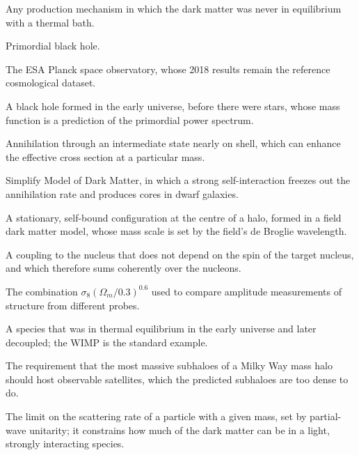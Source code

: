 \begin{description}[style=nextline,leftmargin=0pt,labelwidth=0pt,labelsep=0pt,
  font=\sffamily\bfseries\small,itemsep=5pt]
\item[Nonthermal production] Any production mechanism in which the dark
matter was never in equilibrium with a thermal bath.

\item[PBH] Primordial black hole.

\item[Planck] The ESA Planck space observatory, whose 2018 results remain
the reference cosmological dataset.

\item[Primordial black hole] A black hole formed in the early universe,
before there were stars, whose mass function is a prediction of the
primordial power spectrum.

\item[Resonance] Annihilation through an intermediate state nearly on shell,
which can enhance the effective cross section at a particular mass.

\item[SIMP] Simplify Model of Dark Matter, in which a strong self-interaction
freezes out the annihilation rate and produces cores in dwarf galaxies.

\item[Soliton] A stationary, self-bound configuration at the centre of a
halo, formed in a field dark matter model, whose mass scale is set by the
field's de Broglie wavelength.

\item[Spin-independent coupling] A coupling to the nucleus that does not
depend on the spin of the target nucleus, and which therefore sums
coherently over the nucleons.

\item[S$8$] The combination $\sigma_8(\Omega_m/0.3)^{0.6}$ used to compare
amplitude measurements of structure from different probes.

\item[Thermal relic] A species that was in thermal equilibrium in the early
universe and later decoupled; the WIMP is the standard example.

\item[Too big to fail] The requirement that the most massive subhaloes of a
Milky Way mass halo should host observable satellites, which the predicted
subhaloes are too dense to do.

\item[Unitarity bound] The limit on the scattering rate of a particle with
a given mass, set by partial-wave unitarity; it constrains how much of the
dark matter can be in a light, strongly interacting species.


\end{description}
